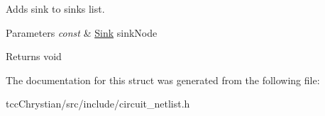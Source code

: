 Adds sink to sinks list. 


\begin{DoxyParams}{Parameters}
{\em const} & \hyperlink{structCircuit__Netlist_1_1Sink}{Sink} sink\-Node\\
\hline
\end{DoxyParams}
\begin{DoxyReturn}{Returns}
void 
\end{DoxyReturn}


The documentation for this struct was generated from the following file\-:\begin{DoxyCompactItemize}
\item 
tcc\-Chrystian/src/include/circuit\-\_\-netlist.\-h\end{DoxyCompactItemize}
